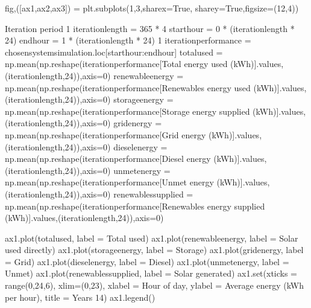 \documentclass[letterpaper,10pt,english]{sphinxmanual}
\begin{document}
\begin{sphinxVerbatim}[commandchars=\\\{\}]
fig,([ax1,ax2,ax3]) = plt.subplots(1,3,sharex=True, sharey=True,figsize=(12,4))

\PYGZsh{}Iteration period 1
iteration\PYGZus{}length = 365 * 4
start\PYGZus{}hour = 0 * (iteration\PYGZus{}length * 24)
end\PYGZus{}hour = 1 * (iteration\PYGZus{}length * 24) \PYGZhy{} 1
iteration\PYGZus{}performance = chosen\PYGZus{}system\PYGZus{}simulation.loc[start\PYGZus{}hour:end\PYGZus{}hour]
total\PYGZus{}used = np.mean(np.reshape(iteration\PYGZus{}performance[\PYGZsq{}Total energy used (kWh)\PYGZsq{}].values,(iteration\PYGZus{}length,24)),axis=0)
renewable\PYGZus{}energy = np.mean(np.reshape(iteration\PYGZus{}performance[\PYGZsq{}Renewables energy used (kWh)\PYGZsq{}].values,(iteration\PYGZus{}length,24)),axis=0)
storage\PYGZus{}energy = np.mean(np.reshape(iteration\PYGZus{}performance[\PYGZsq{}Storage energy supplied (kWh)\PYGZsq{}].values,(iteration\PYGZus{}length,24)),axis=0)
grid\PYGZus{}energy = np.mean(np.reshape(iteration\PYGZus{}performance[\PYGZsq{}Grid energy (kWh)\PYGZsq{}].values,(iteration\PYGZus{}length,24)),axis=0)
diesel\PYGZus{}energy = np.mean(np.reshape(iteration\PYGZus{}performance[\PYGZsq{}Diesel energy (kWh)\PYGZsq{}].values,(iteration\PYGZus{}length,24)),axis=0)
unmet\PYGZus{}energy = np.mean(np.reshape(iteration\PYGZus{}performance[\PYGZsq{}Unmet energy (kWh)\PYGZsq{}].values,(iteration\PYGZus{}length,24)),axis=0)
renewables\PYGZus{}supplied = np.mean(np.reshape(iteration\PYGZus{}performance[\PYGZsq{}Renewables energy supplied (kWh)\PYGZsq{}].values,(iteration\PYGZus{}length,24)),axis=0)

ax1.plot(total\PYGZus{}used, label = \PYGZsq{}Total used\PYGZsq{})
ax1.plot(renewable\PYGZus{}energy, label = \PYGZsq{}Solar used directly\PYGZsq{})
ax1.plot(storage\PYGZus{}energy, label = \PYGZsq{}Storage\PYGZsq{})
ax1.plot(grid\PYGZus{}energy, label = \PYGZsq{}Grid\PYGZsq{})
ax1.plot(diesel\PYGZus{}energy, label = \PYGZsq{}Diesel\PYGZsq{})
ax1.plot(unmet\PYGZus{}energy, label = \PYGZsq{}Unmet\PYGZsq{})
ax1.plot(renewables\PYGZus{}supplied, label = \PYGZsq{}Solar generated\PYGZsq{})
ax1.set(xticks = range(0,24,6),
        xlim=(0,23),
        xlabel = \PYGZsq{}Hour of day\PYGZsq{},
        ylabel = \PYGZsq{}Average energy (kWh per hour)\PYGZsq{},
        title = \PYGZsq{}Years 1\PYGZhy{}4\PYGZsq{})
ax1.legend()


\end{sphinxVerbatim}
\end{document}
